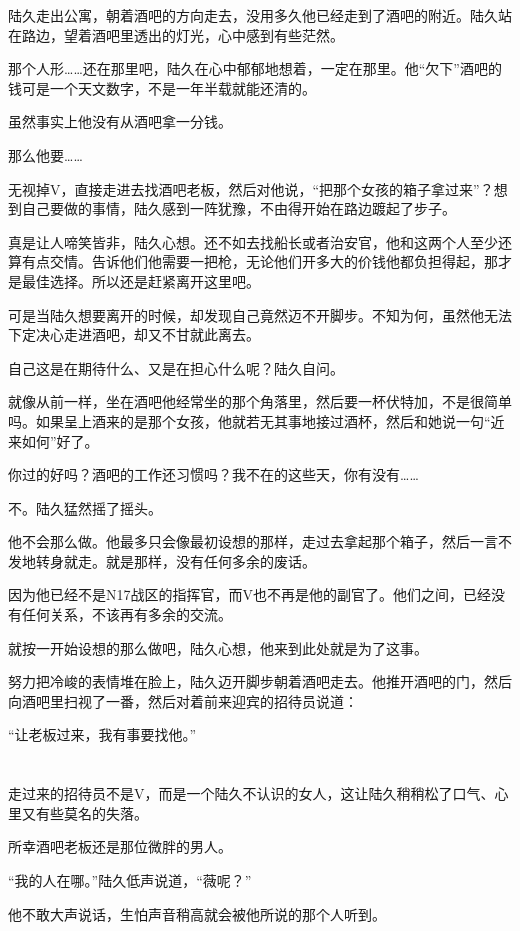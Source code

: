 陆久走出公寓，朝着酒吧的方向走去，没用多久他已经走到了酒吧的附近。陆久站在路边，望着酒吧里透出的灯光，心中感到有些茫然。

那个人形……还在那里吧，陆久在心中郁郁地想着，一定在那里。他“欠下”酒吧的钱可是一个天文数字，不是一年半载就能还清的。

虽然事实上他没有从酒吧拿一分钱。

那么他要……

无视掉V，直接走进去找酒吧老板，然后对他说，“把那个女孩的箱子拿过来”？想到自己要做的事情，陆久感到一阵犹豫，不由得开始在路边踱起了步子。

真是让人啼笑皆非，陆久心想。还不如去找船长或者治安官，他和这两个人至少还算有点交情。告诉他们他需要一把枪，无论他们开多大的价钱他都负担得起，那才是最佳选择。所以还是赶紧离开这里吧。

可是当陆久想要离开的时候，却发现自己竟然迈不开脚步。不知为何，虽然他无法下定决心走进酒吧，却又不甘就此离去。

自己这是在期待什么、又是在担心什么呢？陆久自问。

就像从前一样，坐在酒吧他经常坐的那个角落里，然后要一杯伏特加，不是很简单吗。如果呈上酒来的是那个女孩，他就若无其事地接过酒杯，然后和她说一句“近来如何”好了。

你过的好吗？酒吧的工作还习惯吗？我不在的这些天，你有没有……

不。陆久猛然摇了摇头。

他不会那么做。他最多只会像最初设想的那样，走过去拿起那个箱子，然后一言不发地转身就走。就是那样，没有任何多余的废话。

因为他已经不是N17战区的指挥官，而V也不再是他的副官了。他们之间，已经没有任何关系，不该再有多余的交流。

就按一开始设想的那么做吧，陆久心想，他来到此处就是为了这事。

努力把冷峻的表情堆在脸上，陆久迈开脚步朝着酒吧走去。他推开酒吧的门，然后向酒吧里扫视了一番，然后对着前来迎宾的招待员说道：

“让老板过来，我有事要找他。”

\section*{}

走过来的招待员不是V，而是一个陆久不认识的女人，这让陆久稍稍松了口气、心里又有些莫名的失落。

所幸酒吧老板还是那位微胖的男人。

“我的人在哪。”陆久低声说道，“薇呢？”

他不敢大声说话，生怕声音稍高就会被他所说的那个人听到。

